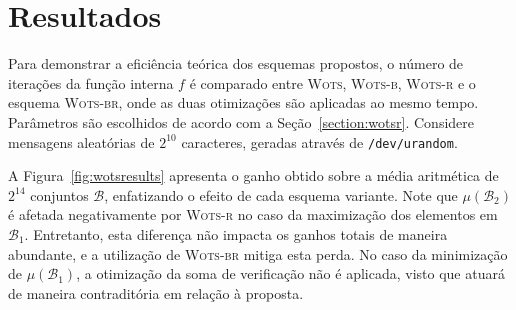 \documentclass{ufsctex/ufsctex}
\newcommand{\bone}{\mathcal{B}_{1}}
\newcommand{\btwo}{\mathcal{B}_{2}}
\newcommand{\wots}{\textsc{Wots}}
\newcommand{\wotsb}{\textsc{Wots-b}}
\newcommand{\wotsr}{\textsc{Wots-r}}
\newcommand{\wotsbr}{\textsc{Wots-br}}
\begin{document}
\section{Resultados}\label{section:results}

Para demonstrar a eficiência teórica dos esquemas propostos, o número de
iterações da função interna $f$ é comparado entre \wots{}, \wotsb{}, \wotsr{} e
o esquema \wotsbr{}, onde as duas otimizações são aplicadas ao mesmo tempo.
Parâmetros são escolhidos de acordo com a Seção~\ref{section:wotsr}. Considere
mensagens aleatórias de $2^{10}$ caracteres, geradas através de
\texttt{/dev/urandom}.

A Figura~\ref{fig:wotsresults} apresenta o ganho obtido sobre a média
aritmética de $2^{14}$ conjuntos $\mathcal{B}$, enfatizando o efeito de cada
esquema variante. Note que $\mu(\btwo{})$ é afetada negativamente por \wotsr{}
no caso da maximização dos elementos em $\bone{}$. Entretanto, esta diferença
não impacta os ganhos totais de maneira abundante, e a utilização de \wotsbr{}
mitiga esta perda. No caso da minimização de $\mu(\bone{})$, a otimização da
soma de verificação não é aplicada, visto que atuará de maneira contraditória
em relação à proposta.
\end{document}
